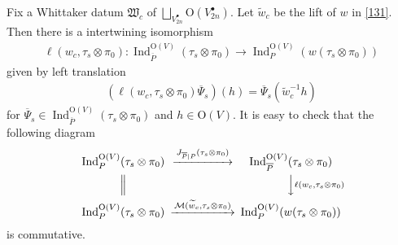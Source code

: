 \documentclass[article]{article}
\numberwithin{equation}{section}
\theoremstyle{definition}
\DeclareMathOperator{\Ind}{Ind}
\begin{document}
\begin{comment}
Put
\begin{align*}
\rho_{\bar P|P}(\tau_{s}\otimes\pi_0)&= \gamma(s,\phi_{\tau}\otimes \phi_{\pi_0}^{\vee},\psi)^{-1}\gamma(2s,\wedge^{2}\circ \phi_{\tau},\psi)^{-1}\\
\rho_{P|\bar P}(\tau_{s}\otimes\pi_0)&= \gamma(-s,\phi_{\tau}^{\vee}\otimes \phi_{\pi_0},\psi_{-1})^{-1}\gamma(-2s,\wedge^{2}\circ \phi_{\tau}^{\vee},\psi_{-1})^{-1}\\
\end{align*}
Here $\phi_{\tau},\phi_{\pi_0},\phi_{\sigma_0}$  is the $L$-parameter of $\tau,\pi_0$ and $\sigma_0$ respectively. 
\end{comment} 
Fix a Whittaker datum $\mathfrak W_{c}$ of $\bigsqcup_{V_{2n}^\bullet}\mathrm O(V_{2n}^\bullet)$. Let $\widetilde{w}_c$ be the lift of $w$ in \ref{131}. Then there is a intertwining isomorphism 
\begin{align*}
\ell(w_c,\tau_s\otimes \pi_0): \Ind_{\overline P}^{\mathrm O(V)}(\tau_{s}\otimes \pi_0)\rightarrow \Ind_P^{\mathrm O(V)}(w(\tau_{s}\otimes \pi_0))
\end{align*}
given by left translation 
\begin{align*}
\left(\ell(w_c,\tau_s\otimes \pi_0)\overline{\Psi}_{s}\right)(h) =\overline{\Psi}_s(\widetilde{w}_{c}^{-1}h)
\end{align*}
for $\overline{\Psi}_s\in \Ind_{\overline P}^{\mathrm O(V)}(\tau_{s}\otimes \pi_0)$ and $h\in \mathrm O(V)$. It is easy to check that the following diagram 
\begin{equation}\label{120}
\begin{CD}
\Ind_{P}^{\mathrm O(V)}(\tau_{s}\otimes \pi_0) @>J_{\overline P| P}(\tau_{s}\otimes \pi_0)>> \Ind_{\overline P}^{\mathrm O(V)}(\tau_{s}\otimes \pi_0) \\
@| @VV\ell(w_c,\tau_s\otimes \pi_0)V\\
\Ind_{P}^{\mathrm O(V)}(\tau_{s}\otimes \pi_0) @>\mathcal M(\widetilde{w}_{c},\tau_{s}\otimes \pi_0)>> \Ind_{P}^{\mathrm O(V)}(w(\tau_{s}\otimes \pi_0))
\end{CD}
\end{equation}
is commutative.  
\end{document}
